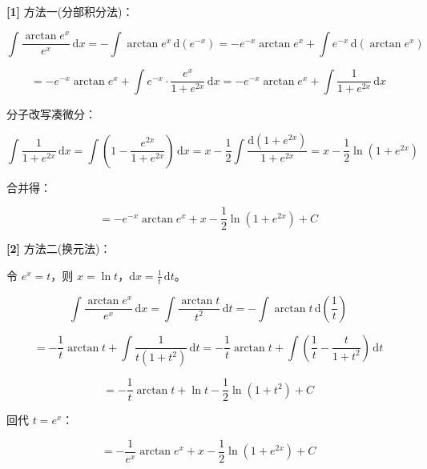 \documentclass[11pt,a4paper,UTF8]{ctexart}
\begin{document}
\begin{solbox}[分步推导与答题规范]
\textbf{[1]} 方法一(分部积分法)：


\begin{equation*}
\int \frac{\arctan e^x}{e^x}\,\mathrm{d}x = -\int \arctan e^x\,\mathrm{d}(e^{-x}) = -e^{-x}\arctan e^x + \int e^{-x}\,\mathrm{d}(\arctan e^x)
\end{equation*}



\begin{equation*}
= -e^{-x}\arctan e^x + \int e^{-x} \cdot \frac{e^x}{1+e^{2x}}\,\mathrm{d}x = -e^{-x}\arctan e^x + \int \frac{1}{1+e^{2x}}\,\mathrm{d}x
\end{equation*}


分子改写凑微分：


\begin{equation*}
\int \frac{1}{1+e^{2x}}\,\mathrm{d}x = \int \left(1 - \frac{e^{2x}}{1+e^{2x}}\right)\,\mathrm{d}x = x - \frac{1}{2}\int \frac{\mathrm{d}(1+e^{2x})}{1+e^{2x}} = x - \frac{1}{2}\ln(1+e^{2x})
\end{equation*}


合并得：


\begin{equation*}
= -e^{-x}\arctan e^x + x - \frac{1}{2}\ln(1+e^{2x}) + C
\end{equation*}


\textbf{[2]} 方法二(换元法)：

令 $e^x = t$，则 $x = \ln t$，$\mathrm{d}x = \frac{1}{t}\,\mathrm{d}t$。


\begin{equation*}
\int \frac{\arctan e^x}{e^x}\,\mathrm{d}x = \int \frac{\arctan t}{t^2}\,\mathrm{d}t = -\int \arctan t\,\mathrm{d}\left(\frac{1}{t}\right)
\end{equation*}



\begin{equation*}
= -\frac{1}{t}\arctan t + \int \frac{1}{t(1+t^2)}\,\mathrm{d}t = -\frac{1}{t}\arctan t + \int \left(\frac{1}{t} - \frac{t}{1+t^2}\right)\,\mathrm{d}t
\end{equation*}



\begin{equation*}
= -\frac{1}{t}\arctan t + \ln t - \frac{1}{2}\ln(1+t^2) + C
\end{equation*}


回代 $t = e^x$：


\begin{equation*}
= -\frac{1}{e^x}\arctan e^x + x - \frac{1}{2}\ln(1+e^{2x}) + C
\end{equation*}

\end{solbox}
\end{document}
